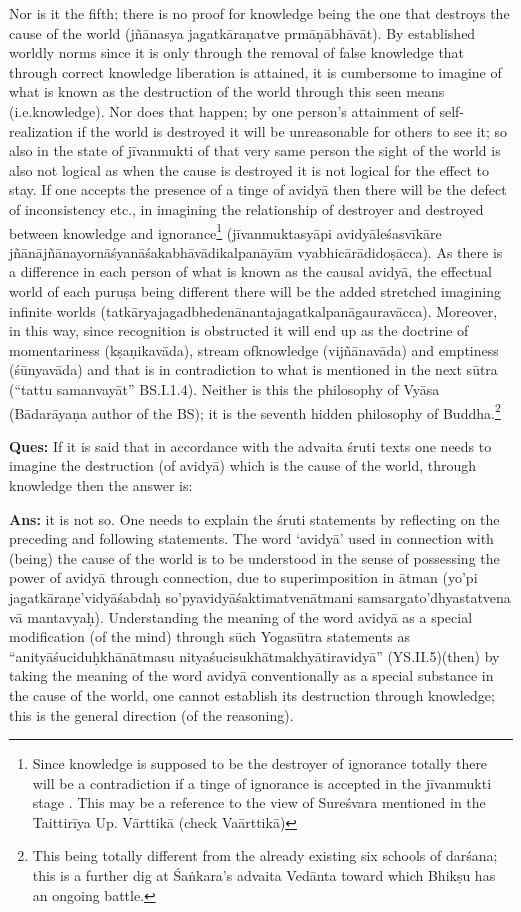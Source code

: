 Nor is it the fifth; there is no proof for knowledge being the one that destroys the cause of the world (jñānasya jagatkāraṇatve prmāṇābhāvāt). By established worldly norms since it is only through the removal of false knowledge that through correct knowledge liberation is attained, it is cumbersome to imagine of what is known as the destruction of the world through this seen means (i.e.knowledge). Nor does that happen; by one person’s attainment of self-realization if the world is destroyed it will be unreasonable for others to see it; so also in the state of jīvanmukti of that very same person the sight of the world is also not logical as when the cause is destroyed it is not logical for the effect to stay. If one accepts the presence of a tinge of avidyā then there will be the defect of inconsistency etc., in imagining the relationship of destroyer and destroyed between knowledge and ignorance\footnote{Since knowledge is supposed to be the destroyer of ignorance totally there will be a contradiction if a tinge of ignorance is accepted in the jīvanmukti stage . This may be a reference to the view of Sureśvara mentioned in the Taittirīya Up. Vārttikā (check Vaārttikā)} (jīvanmuktasyāpi avidyāleśasvīkāre jñānājñānayornāśyanāśakabhāvā\-dikalpanāyām vyabhicārādidoṣācca). As there is a difference in each person of what is known as the causal avidyā, the effectual world of each puruṣa being different there will be the added stretched imagining infinite worlds (tatkāryajagadbhedenānantajagatkalpanāgaura\-vācca). Moreover, in this way, since recognition is obstructed it will end up as the doctrine of momentariness (kṣaṇikavāda), stream of\break knowledge (vijñānavāda) and emptiness (śūnyavāda) and that is in contradiction to what is mentioned in the next sūtra (“tattu samanvayāt” BS.I.1.4). Neither is this the philosophy of Vyāsa (Bādarāyaṇa author of the BS); it is the seventh hidden philosophy of Buddha.\footnote{This being totally different from the already existing six schools of darśana; this is a further dig at Śaṅkara’s advaita Vedānta toward which Bhikṣu has an ongoing battle.}

\textbf{Ques:} If it is said that in accordance with the advaita śruti texts one needs to imagine the destruction (of avidyā) which is the cause of the world, through knowledge then the answer is:

\textbf{Ans:} it is not so. One needs to explain the śruti statements by reflecting on the preceding and following statements. The word ‘avidyā’ used in connection with (being) the cause of the world is to be understood in the sense of possessing the power of avidyā through connection, due to superimposition in ātman (yo’pi jagatkāraṇe’vidyāśabdaḥ so’pyavidyāśaktimatvenātmani samsargato’dhyastatvena vā manta\break\-vyaḥ). Understanding the meaning of the word avidyā as a special modification (of the mind) through sūch Yogasūtra statements as “anityāśuciduḥkhānātmasu nityaśucisukhātmakhyātiravidyā” (YS.II.5)\break (then) by taking the meaning of the word avidyā conventionally as a special substance in the cause of the world, one cannot establish its destruction through knowledge; this is the general direction (of the reasoning).

